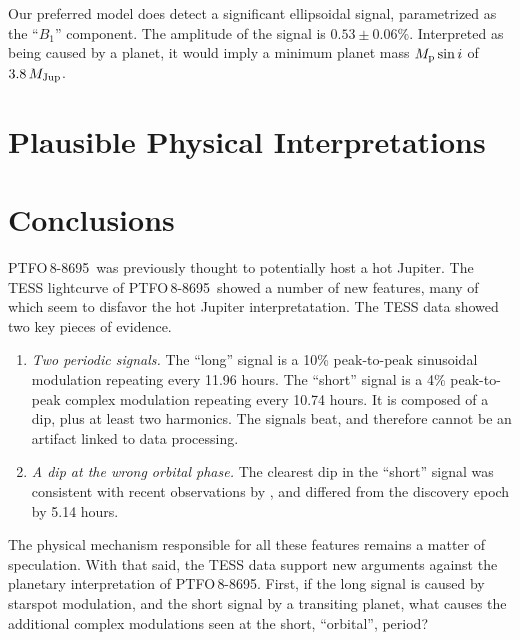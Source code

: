 \documentclass[12pt,twocolumn,tighten]{aastex62}
\newcommand{\ptfo}{PTFO$\,$8-8695}
\begin{document}
Our preferred model does detect a significant ellipsoidal signal,
parametrized as the ``$B_1$'' component.  The amplitude of the signal
is $0.53 \pm 0.06\%$.  Interpreted as being caused by a planet, it
would imply a minimum planet mass $M_{\rm p} \sin i$ of $3.8\,M_{\rm
Jup}$.







\section{Plausible Physical Interpretations}





\section{Conclusions}
\label{sec:conclusions}

\ptfo\ was previously thought to potentially host a hot Jupiter.
The TESS lightcurve of \ptfo\ showed a number of new features,
many of which seem to disfavor the hot Jupiter interpretatation.
The TESS data showed two key pieces of evidence.
\begin{enumerate}
  \item {\it Two periodic signals.} The ``long'' signal is a 10\%
      peak-to-peak sinusoidal modulation repeating every 11.96 hours.
      The ``short'' signal is a 4\% peak-to-peak complex modulation
      repeating every 10.74 hours. It is composed of a dip, plus at
      least two harmonics. The signals beat, and therefore cannot be
      an artifact linked to data processing.
  \item {\it A dip at the wrong orbital phase.} The clearest dip in
    the ``short'' signal was consistent with recent observations by
    \citet{tanimoto_evidence_2020}, and differed from the discovery
    epoch by 5.14 hours.
\end{enumerate}

The physical mechanism responsible for all these features remains a
matter of speculation.
With that said, the TESS data support new arguments against the planetary
interpretation of \ptfo.
First, if the long signal is caused by starspot modulation, and the
short signal by a transiting planet, what causes the additional
complex modulations seen at the short, ``orbital'', period?
\end{document}
